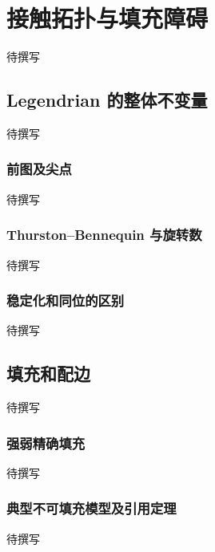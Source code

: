 
% 
% 
% 
% 
% 
% 

\chapter{接触拓扑与填充障碍}
\label{g4:app:D}

待撰写

\section{Legendrian 的整体不变量}
\label{g4:sec:D01}
待撰写

\subsection{前图及尖点}
\label{g4:subsec:D01:01}
待撰写

\subsection{Thurston–Bennequin 与旋转数}
\label{g4:subsec:D01:02}
待撰写

\subsection{稳定化和同位的区别}
\label{g4:subsec:D01:03}
待撰写

\section{填充和配边}
\label{g4:sec:D02}
待撰写

\subsection{强弱精确填充}
\label{g4:subsec:D02:01}
待撰写

\subsection{典型不可填充模型及引用定理}
\label{g4:subsec:D02:02}
待撰写

